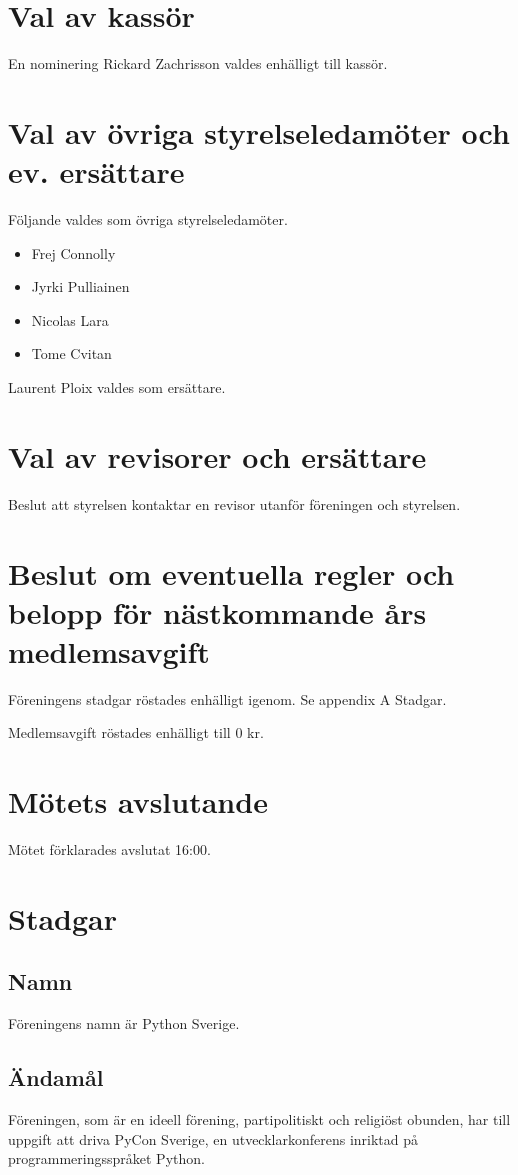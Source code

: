 \documentclass[11pt, a4paper]{article}
\begin{document}
\section{Val av kassör}
En nominering Rickard Zachrisson valdes enhälligt till kassör.

\section{Val av övriga styrelseledamöter och ev. ersättare}
Följande valdes som övriga styrelseledamöter.

\begin{itemize}
    \item Frej Connolly
    \item Jyrki Pulliainen
    \item Nicolas Lara
    \item Tome Cvitan
\end{itemize}
Laurent Ploix valdes som ersättare.

\section{Val av revisorer och ersättare}
Beslut att styrelsen kontaktar en revisor utanför föreningen och styrelsen.

\section{Beslut om eventuella regler och belopp för nästkommande års medlemsavgift}
Föreningens stadgar röstades enhälligt igenom. Se appendix A Stadgar.

Medlemsavgift röstades enhälligt till 0 kr.

\section{Mötets avslutande}
Mötet förklarades avslutat 16:00.

\newpage
\appendix
\section{Stadgar}
\subsection{Namn}
Föreningens namn är Python Sverige.

\subsection{Ändamål}
Föreningen, som är en ideell förening, partipolitiskt och religiöst obunden, har till uppgift att driva PyCon Sverige, en utvecklarkonferens inriktad på programmeringsspråket Python.
\end{document}

